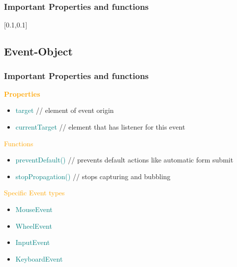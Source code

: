 \documentclass[main.tex,fontsize=6pt,paper=a4,paper=landscape,DIV=calc,]{scrartcl}
\begin{document}
\begin{multicols*}{4}
\subsubsection{Important Properties and functions}  
[0.1,0.1]

\subsection{Event-Object}

\subsubsection{Important Properties and functions}  
\textcolor{orange}{\textbf{Properties}}
\begin{itemize}
  \item \textcolor{teal}{target} // element of event origin 
  \item \textcolor{teal}{currentTarget} // element that has listener for this event
\end{itemize}
\textcolor{orange}{Functions}
\begin{itemize}
  \item \textcolor{teal}{preventDefault()} // prevents default actions like automatic form submit
  \item \textcolor{teal}{stopPropagation()} // stops capturing and bubbling
\end{itemize}
\textcolor{orange}{Specific Event types}
\begin{itemize}
  \item \textcolor{teal}{MouseEvent}
  \item \textcolor{teal}{WheelEvent}
  \item \textcolor{teal}{InputEvent}
  \item \textcolor{teal}{KeyboardEvent}
\end{itemize}


\end{multicols*}
\end{document}
